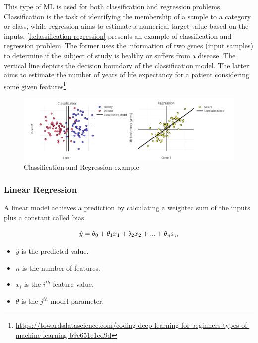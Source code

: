 This type of \ac{ML} is used for both classification and regression problems. Classification is the task of identifying the membership of a sample to a category or class, while regression aims to estimate a numerical target value based on the inputs. \autoref{f:classification-regression} presents an example of classification and regression problem. The former uses the information of two genes (input samples) to determine if the subject of study is healthy or suffers from a disease. The vertical line depicts the decision boundary of the classification model. The latter aims to estimate the number of years of life expectancy for a patient considering some given features\footnote{\url{https://towardsdatascience.com/coding-deep-learning-for-beginners-types-of-machine-learning-b9e651e1ed9d}}. 

\begin{figure}[h]
\centering
\includegraphics[width=\linewidth]{figures/Ch2/Regression-Classification.pdf}
\caption{Classification and Regression example}
\label{f:classification-regression}
\end{figure}

\subsubsection{Linear Regression}
A linear model achieves a prediction by calculating a weighted sum of the inputs plus a constant called bias.

\begin{equation}
    \hat{y} = \theta_0 + \theta_1 x_1 + \theta_2 x_2 + ...+ \theta_n x_n\\
\end{equation}

\begin{itemize}
    \item \begin{math}\hat{y}\end{math} is the predicted value.
    \item \begin{math}n\end{math} is the number of features.
    \item \begin{math}x_i\end{math} is the \begin{math}i^{th}\end{math} feature value.
    \item \begin{math}\theta\end{math} is the \begin{math}j^{th}\end{math} model parameter.
\end{itemize}

